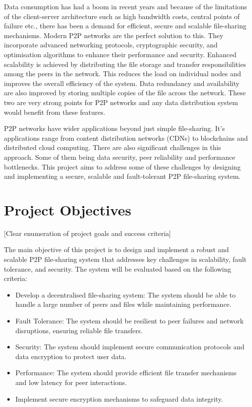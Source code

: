 \documentclass[12pt,a4paper]{report}
\begin{document}
Data consumption has had a boom in recent years and because of the limitations of the client-server architecture such as high bandwidth costs, central points of failure etc., there has been a demand for efficient, secure and scalable file-sharing mechanisms. Modern P2P networks are the perfect solution to this. They incorporate advanced networking protocols, cryptographic security, and optimisation algorithms to enhance their performance and security. Enhanced scalability is achieved by distributing the file storage and transfer responsibilities among the peers in the network. This reduces the load on individual nodes and improves the overall efficiency of the system. Data redundancy and availability are also improved by storing multiple copies of the file across the network. These two are very strong points for P2P networks and any data distribution system would benefit from these features.

P2P networks have wider applications beyond just simple file-sharing. It's applications range from content distribution networks (CDNs) to blockchains and distributed cloud computing. There are also significant challenges in this approach. Some of them being data security, peer reliability and performance bottlenecks. This project aims to address some of these challenges by designing and implementing a secure, scalable and fault-tolerant P2P file-sharing system.


\section{Project Objectives}
 [Clear enumeration of project goals and success criteria]

The main objective of this project is to design and implement a robust and scalable P2P file-sharing system that addresses key challenges in scalability, fault tolerance, and security. The system will be evaluated based on the following criteria:

\begin{itemize}
	\item Develop a decentralised file-sharing system: The system should be able to handle a large number of peers and files while maintaining performance.
	\item Fault Tolerance: The system should be resilient to peer failures and network disruptions, ensuring reliable file transfers.
	\item Security: The system should implement secure communication protocols and data encryption to protect user data.
	\item Performance: The system should provide efficient file transfer mechanisms and low latency for peer interactions.
	\item Implement secure encryption mechanisms to safeguard data integrity.
\end{itemize}
\end{document}
